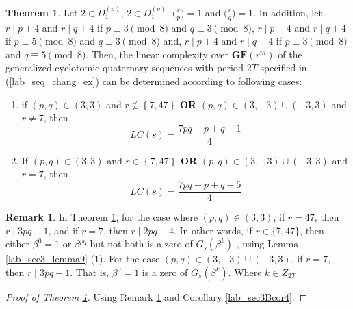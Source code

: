 \documentclass{mcom-l}
\theoremstyle{definition}
\newtheorem{sec3_B_remark3}[sec3_remark1]{Remark}
\newtheorem{sec3thm2aux1}[sec3thm1]{Theorem}
\numberwithin{equation}{section}
\begin{document}
\begin{sec3thm2aux1}\label{lab_sec3thm2aux1}
  Let $ 2\in D_{1}^{(p)} $, $ 2\in D_{1}^{(q)} $, $ \bigl(\tfrac{r}{p}\bigr) =1$ and $ \bigl(\tfrac{r}{q}\bigr) =1$. In addition, let $ r\mid p+4 $ and $ r\mid q+4 $ if $ p\equiv 3 \pmod 8 $ and $ q\equiv 3 \pmod 8 $, $ r\mid p-4 $ and $ r\mid q+4 $ if $ p\equiv 5 \pmod 8 $ and $ q\equiv 3 \pmod 8 $ and, $ r\mid p+4 $ and $ r\mid q-4 $ if $ p\equiv 3 \pmod 8 $ and $ q\equiv 5 \pmod 8 $. Then, the linear complexity over $ \mathbf{GF}(r^{m}) $ of the generalized cyclotomic quaternary sequences with period $ 2T $ specified in (\ref{lab_seq_chang_ex}) can be determined according to following cases:
  \begin{enumerate} \item if $ (p,q)\in (3,3) $ and  $ r\notin\left\lbrace 7,47\right\rbrace $ \textbf{OR} $ (p,q)\in (3,-3) \cup (-3,3)$ and $ r\ne 7 $, then
    \begin{equation*}
        LC(s)=\dfrac{7pq+p+q-1}{4}
     \end{equation*}
\item If $ (p,q)\in (3,3) $ and  $ r\in\left\lbrace 7,47\right\rbrace $ \textbf{OR} $ (p,q)\in (3,-3) \cup (-3,3)$ and $ r=7 $, then
     \begin{equation*}
      LC(s)=\dfrac{7pq+p+q-5}{4}
      \end{equation*}
\end{enumerate}
  \end{sec3thm2aux1}
  
  \begin{sec3_B_remark3}\label{Lab_sec3_B_remark3}
  In Theorem \ref{lab_sec3thm2aux1}, for the case where $ (p,q)\in (3,3) $, if $ r=47 $, then $ r\mid 3pq-1 $, and if $ r=7 $, then $ r\mid 2pq-4 $. In  other words, if $ r\in \lbrace 7,47\rbrace $, then either $ \beta^{0} =1$ or $ \beta^{pq}  $ but not both is a zero of $ G_{s}(\beta^{k}) $ , using Lemma \ref{lab_sec3_lemma9} (1). For the case $ (p,q)\in (3,-3)\cup (-3,3) $, if $ r=7 $, then $ r\mid 3pq-1 $. That is, $ \beta^{0} =1$ is a zero of $ G_{s}(\beta^{k}) $. Where $ k\in Z_{2T} $
  \end{sec3_B_remark3}
  \begin{proof}[Proof of Theorem \ref{lab_sec3thm2aux1}]
  Using Remark \ref{Lab_sec3_B_remark3} and Corollary \ref{lab_sec3Bcor4}.
  \end{proof}
  
\end{document}
